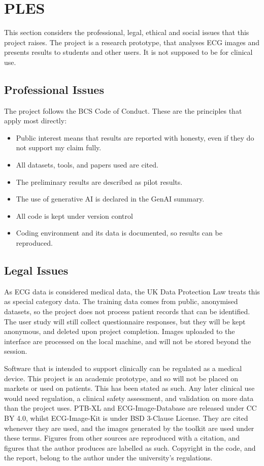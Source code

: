 \section{PLES}
\label{app:ples}


This section considers the professional, legal, ethical and social issues that this project raises. The project is a research prototype, that analyses ECG images and presents results to students and other users. It is not supposed to be for clinical use.
\subsection{Professional Issues}
The project follows the BCS Code of Conduct. These are the principles that apply most directly:

\begin{itemize}
  \item Public interest means that results are reported with honesty, even if they do not support my claim fully.  
  \item All datasets, tools, and papers used are cited.
  \item The preliminary results are described as pilot results.
  \item The use of generative AI is declared in the GenAI summary.
  \item All code is kept under version control
  \item Coding environment and its data is documented, so results can be reproduced.
\end{itemize}

\subsection{Legal Issues}
As ECG data is considered medical data, the UK Data Protection Law treats this as special category data. The training data comes from public, anonymised datasets, so the project does not process patient records that can be identified. The user study will still collect questionnaire responses, but they will be kept anonymous, and deleted upon project completion. Images uploaded to the interface are processed on the local machine, and will not be stored beyond the session.

Software that is intended to support clinically can be regulated as a medical device. This project is an academic prototype, and so will not be placed on markets or used on patients. This has been stated as such. Any later clinical use would need regulation, a clinical safety assessment, and validation on more data than the project uses.
PTB-XL and ECG-Image-Database are released under CC BY 4.0, whilst ECG-Image-Kit is under BSD 3-Clause License. They are cited whenever they are used, and the images generated by the toolkit are used under these terms. Figures from other sources are reproduced with a citation, and figures that the author produces are labelled as such. Copyright in the code, and the report, belong to the author under the university's regulations. 


